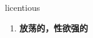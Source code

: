 
\begin{frame}
{\huge licentious}
\begin{center}
\begin{enumerate}\Large
  \item \textbf{放荡的，性欲强的}
\end{enumerate}
\end{center}
\end{frame}
